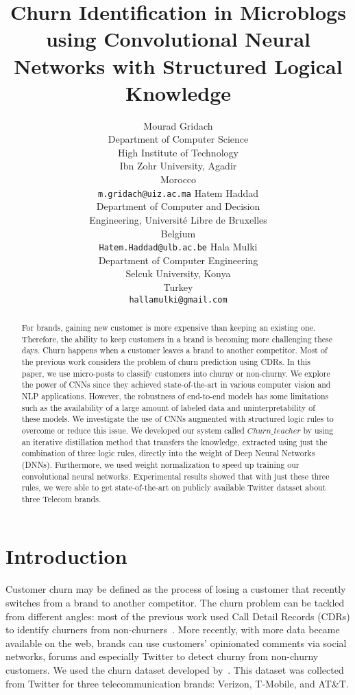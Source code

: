 \documentclass[11pt,letterpaper]{article}
\title{Churn Identification in Microblogs using Convolutional Neural Networks with Structured Logical Knowledge}
\author{Mourad Gridach \\    Department of Computer Science \\ High Institute of Technology \\  Ibn Zohr University, Agadir \\  Morocco \\ {\tt m.gridach@uiz.ac.ma} 
         \AND
         Hatem Haddad \\ Department of Computer and Decision \\ Engineering, Universit\'{e} Libre de Bruxelles\\ Belgium  \\ {\tt Hatem.Haddad@ulb.ac.be}
         \And
         Hala Mulki \\ Department of Computer Engineering \\ Selcuk University, Konya \\ Turkey \\ {\tt hallamulki@gmail.com}
         }
\date{}
\begin{document}
\maketitle

\begin{abstract}

For brands, gaining new customer is more expensive than keeping an existing one. Therefore, the ability to keep customers in a brand is becoming more challenging these days.  Churn happens when a customer leaves a brand to another competitor. Most of the previous work considers the problem of churn prediction using CDRs. In this paper, we use micro-posts to classify customers into churny or non-churny. 
We explore the power of CNNs since they achieved state-of-the-art in various computer vision and NLP applications. However, the robustness of end-to-end models has some limitations such as the availability of a large amount of labeled data and uninterpretability of these models. We investigate the use of CNNs augmented with structured logic rules to overcome or reduce this issue. We developed our system called \(Churn\_teacher\) by using an iterative distillation method that transfers the knowledge, extracted using just the combination of three logic rules, directly into the weight of Deep Neural Networks (DNNs). Furthermore, we used weight normalization to speed up training our convolutional neural networks. Experimental results showed that with just these three rules, we were able to get state-of-the-art on publicly available Twitter dataset about three Telecom brands.
\end{abstract}


\section{Introduction}

Customer churn may be defined as the process of losing a customer that recently switches from a brand to another competitor. The churn problem can be tackled from different angles: most of the previous work used Call Detail Records (CDRs) to identify churners from non-churners~\cite{zaratiegui}. More recently, with more data became available on the web, brands can use customers’ opinionated comments via social networks, forums and especially Twitter to detect churny from non-churny customers. We used the churn dataset developed by~\cite{amiri2015}. This dataset was collected from Twitter for three telecommunication brands: Verizon, T-Mobile, and AT\&T. 
\end{document}
